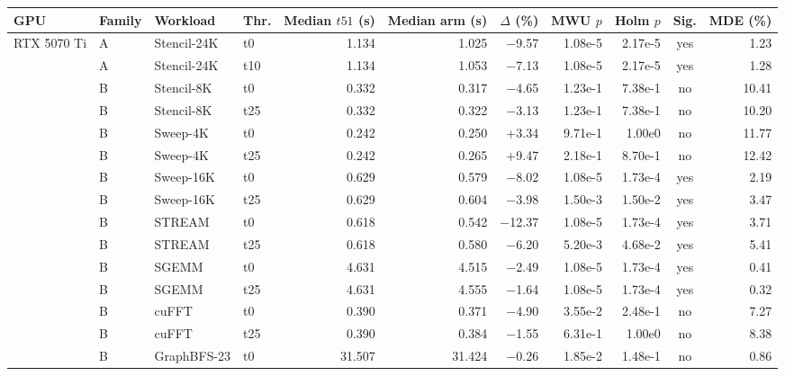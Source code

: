 \begin{tabular}{@{}llllrrrrrcr@{}}
\toprule
GPU & Family & Workload & Thr. & Median $t51$ (s) & Median arm (s) & $\Delta$ (\%) & MWU $p$ & Holm $p$ & Sig. & MDE (\%) \\
\midrule
RTX 5070 Ti & A & Stencil-24K & t0 & 1.134 & 1.025 & $-$9.57 & 1.08e-5 & 2.17e-5 & yes & 1.23 \\ %
 & A & Stencil-24K & t10 & 1.134 & 1.053 & $-$7.13 & 1.08e-5 & 2.17e-5 & yes & 1.28 \\ %
 & B & Stencil-8K & t0 & 0.332 & 0.317 & $-$4.65 & 1.23e-1 & 7.38e-1 & no & 10.41 \\ %
 & B & Stencil-8K & t25 & 0.332 & 0.322 & $-$3.13 & 1.23e-1 & 7.38e-1 & no & 10.20 \\ %
 & B & Sweep-4K & t0 & 0.242 & 0.250 & +3.34 & 9.71e-1 & 1.00e0 & no & 11.77 \\ %
 & B & Sweep-4K & t25 & 0.242 & 0.265 & +9.47 & 2.18e-1 & 8.70e-1 & no & 12.42 \\ %
 & B & Sweep-16K & t0 & 0.629 & 0.579 & $-$8.02 & 1.08e-5 & 1.73e-4 & yes & 2.19 \\ %
 & B & Sweep-16K & t25 & 0.629 & 0.604 & $-$3.98 & 1.50e-3 & 1.50e-2 & yes & 3.47 \\ %
 & B & STREAM & t0 & 0.618 & 0.542 & $-$12.37 & 1.08e-5 & 1.73e-4 & yes & 3.71 \\ %
 & B & STREAM & t25 & 0.618 & 0.580 & $-$6.20 & 5.20e-3 & 4.68e-2 & yes & 5.41 \\ %
 & B & SGEMM & t0 & 4.631 & 4.515 & $-$2.49 & 1.08e-5 & 1.73e-4 & yes & 0.41 \\ %
 & B & SGEMM & t25 & 4.631 & 4.555 & $-$1.64 & 1.08e-5 & 1.73e-4 & yes & 0.32 \\ %
 & B & cuFFT & t0 & 0.390 & 0.371 & $-$4.90 & 3.55e-2 & 2.48e-1 & no & 7.27 \\ %
 & B & cuFFT & t25 & 0.390 & 0.384 & $-$1.55 & 6.31e-1 & 1.00e0 & no & 8.38 \\ %
 & B & GraphBFS-23 & t0 & 31.507 & 31.424 & $-$0.26 & 1.85e-2 & 1.48e-1 & no & 0.86 \\ %

\end{tabular}
